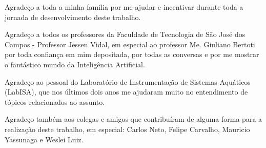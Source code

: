 \begin{agradecimentos}

\par Agradeço a toda a minha família por me ajudar e incentivar durante toda a jornada de desenvolvimento deste trabalho.
\par Agradeço a todos os professores da Faculdade de Tecnologia de São José dos Campos - Professor Jessen Vidal, em especial ao professor Me. Giuliano Bertoti por toda confiança em mim depositada, por todas as conversas e por me mostrar o fantástico mundo da Inteligência Artificial.
\par Agradeço ao pessoal do Laboratório de Instrumentação de Sistemas Aquáticos (LabISA), que nos últimos dois anos me ajudaram muito no entendimento de tópicos relacionados ao assunto.
\par Agradeço também aos colegas e amigos que contribuíram de alguma forma para a realização deste trabalho, em especial: Carlos Neto, Felipe Carvalho, Mauricio Yassunaga e Weslei Luiz.

\end{agradecimentos}
